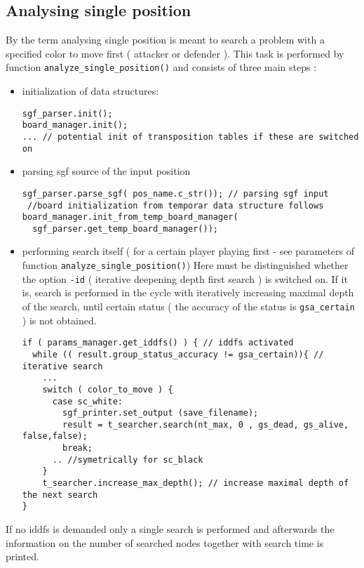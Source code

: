 \subsection{Analysing single position}\label{page_2_page_2__sec_3}
By the term analysing single position is meant to search a problem with a specified color to move first ( attacker or defender ). This task is performed by function {\tt analyze\_\-single\_\-position()} and consists of three main steps :\begin{itemize}
\item initialization of data structures: 

\footnotesize\begin{verbatim}sgf_parser.init();
board_manager.init();
... // potential init of transposition tables if these are switched on
\end{verbatim}
\normalsize
\item parsing sgf source of the input position 

\footnotesize\begin{verbatim}sgf_parser.parse_sgf( pos_name.c_str()); // parsing sgf input 
 //board initialization from temporar data structure follows
board_manager.init_from_temp_board_manager( 
  sgf_parser.get_temp_board_manager()); 
\end{verbatim}
\normalsize
\item performing search itself ( for a certain player playing first - see parameters of function {\tt analyze\_\-single\_\-position()}) Here must be distinguished whether the option {\tt -id} ( iterative deepening depth first search ) is switched on. If it is, search is performed in the cycle with iteratively increasing maximal depth of the search, until certain status ( the accuracy of the status is {\tt gsa\_\-certain} ) is not obtained. 

\footnotesize\begin{verbatim}if ( params_manager.get_iddfs() ) { // iddfs activated
  while (( result.group_status_accuracy != gsa_certain)){ // iterative search
    ...
    switch ( color_to_move ) {
      case sc_white: 
        sgf_printer.set_output (save_filename);
        result = t_searcher.search(nt_max, 0 , gs_dead, gs_alive, false,false);
        break;
      .. //symetrically for sc_black
    }
    t_searcher.increase_max_depth(); // increase maximal depth of the next search
}
\end{verbatim}
\normalsize
\end{itemize}


If no iddfs is demanded only a single search is performed and afterwards the information on the number of searched nodes together with search time is printed. 